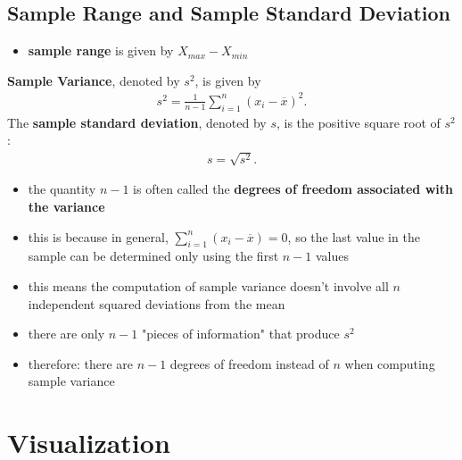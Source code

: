 \documentclass[10pt]{article}
\begin{document}
\subsection{Sample Range and Sample Standard Deviation}
\begin{itemize}
    \item \textbf{sample range} is given by $X_{max} - X_{min}$
\end{itemize}
\begin{definition}
    \textbf{Sample Variance}, denoted by $s^2$, is given by
    \begin{align*}
        s^2 = \frac{1}{n-1} \sum_{i=1}^n \left( x_i - \overline{x} \right)^2
    .\end{align*}
    The \textbf{sample standard deviation}, denoted by $s$, is the positive square root of $s^2$:
    \begin{gather*}
        s = \sqrt{s^2}
    .\end{gather*}
\end{definition}
\begin{itemize}
    \item the quantity $n-1$ is often called the \textbf{degrees of freedom associated with the variance}
    \item this is because in general, $\sum_{i=1}^{n} (x_i-\overline{x}) = 0$, so the last value in the sample can be determined only using the first $n-1$ values
    \item this means the computation of sample variance doesn't involve all $n$ independent squared deviations from the mean
    \item there are only $n-1$ "pieces of information" that produce $s^2$ 
    \item therefore: there are $n-1$ degrees of freedom instead of $n$ when computing sample variance
\end{itemize}



\section{Visualization}
\end{document}
